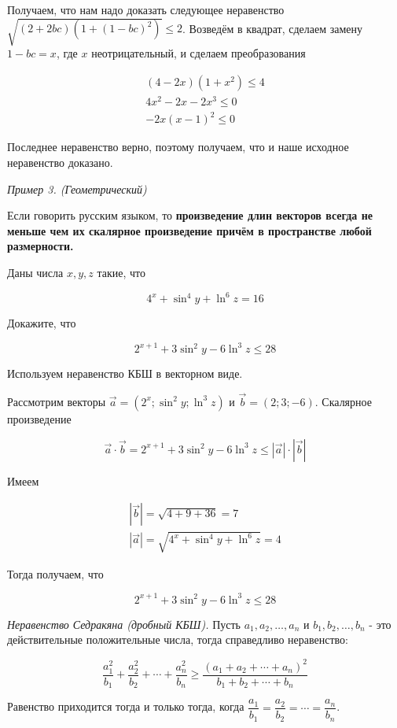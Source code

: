 Получаем, что нам надо доказать следующее неравенство $\sqrt{(2+2 b c)\left(1+(1-b c)^2\right)} \leqslant 2$. Возведём в квадрат, сделаем замену $1-b c=x$, где $x$ неотрицательный, и сделаем преобразования

$$
\begin{gathered}
(4-2 x)\left(1+x^2\right) \leqslant 4 \\
4 x^2-2 x-2 x^3 \leqslant 0 \\
-2 x(x-1)^2 \leqslant 0
\end{gathered}
$$


Последнее неравенство верно, поэтому получаем, что и наше исходное неравенство доказано.

\textit{Пример 3. (Геометрический)}

Если говорить русским языком, то \textbf{произведение длин векторов всегда не меньше чем их скалярное произведение причём в пространстве любой размерности.}

Даны числа $x, y, z$ такие, что

$$
4^x+\sin ^4 y+\ln ^6 z=16
$$


Докажите, что

$$
2^{x+1}+3 \sin ^2 y-6 \ln ^3 z \leqslant 28
$$


Используем неравенство КБШ в векторном виде.

Рассмотрим векторы $\vec{a}=\left(2^x ; \sin ^2 y ; \ln ^3 z\right)$ и $\vec{b}=(2 ; 3 ;-6)$. Скалярное произведение

$$
\vec{a} \cdot \vec{b}=2^{x+1}+3 \sin ^2 y-6 \ln ^3 z \leqslant|\vec{a}| \cdot|\vec{b}|
$$


Имеем

$$
\begin{gathered}
|\vec{b}|=\sqrt{4+9+36}=7 \\
|\vec{a}|=\sqrt{4^x+\sin ^4 y+\ln ^6 z}=4
\end{gathered}
$$


Тогда получаем, что

$$
2^{x+1}+3 \sin ^2 y-6 \ln ^3 z \leqslant 28
$$

\textit{Неравенство Седракяна (дробный КБШ).}
Пусть $a_1, a_2, \ldots, a_n$ и $b_1, b_2, \ldots, b_n$ - это действительные положительные числа, тогда справедливо неравенство:

$$
\dfrac{a_1^2}{b_1}+\dfrac{a_2^2}{b_2}+\cdots+\dfrac{a_n^2}{b_n} \geqslant \dfrac{\left(a_1+a_2+\cdots+a_n\right)^2}{b_1+b_2+\cdots+b_n}
$$

Равенство приходится тогда и только тогда, когда $\dfrac{a_1}{b_1}=\dfrac{a_2}{b_2}=\cdots=\dfrac{a_n}{b_n}$.

